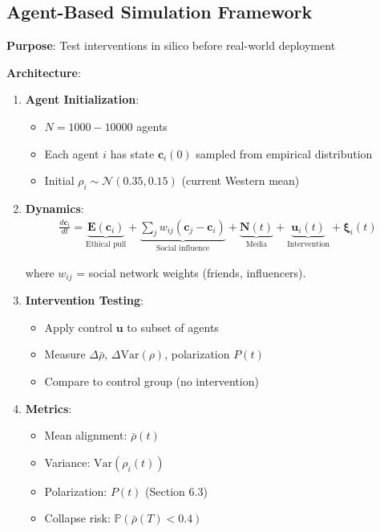 \documentclass[11pt,a4paper]{article}
\theoremstyle{definition}
\theoremstyle{remark}
\newcommand{\EE}{\mathbf{E}}
\newcommand{\cc}{\mathbf{c}}
\begin{document}
\begin{small}
\begin{enumerate}
\subsection{Agent-Based Simulation Framework}

\begin{protocol}
\textbf{Purpose}: Test interventions in silico before real-world deployment

\textbf{Architecture}:
\begin{enumerate}
    \item \textbf{Agent Initialization}:
        \begin{itemize}
            \item \(N = 1000-10000\) agents
            \item Each agent \(i\) has state \(\cc_i(0)\) sampled from empirical distribution
            \item Initial \(\rho_i \sim \mathcal{N}(0.35, 0.15)\) (current Western mean)
        \end{itemize}
    
    \item \textbf{Dynamics}:
        \begin{align}
        \frac{d\cc_i}{dt} = \underbrace{\EE(\cc_i)}_{\text{Ethical pull}} + \underbrace{\sum_j w_{ij}(\cc_j - \cc_i)}_{\text{Social influence}} + \underbrace{\mathbf{N}(t)}_{\text{Media}} + \underbrace{\mathbf{u}_i(t)}_{\text{Intervention}} + \boldsymbol{\xi}_i(t)
        \end{align}
        
        where \(w_{ij}\) = social network weights (friends, influencers).
    
    \item \textbf{Intervention Testing}:
        \begin{itemize}
            \item Apply control \(\mathbf{u}\) to subset of agents
            \item Measure \(\Delta\bar{\rho}\), \(\Delta\text{Var}(\rho)\), polarization \(P(t)\)
            \item Compare to control group (no intervention)
        \end{itemize}
    
    \item \textbf{Metrics}:
        \begin{itemize}
            \item Mean alignment: \(\bar{\rho}(t)\)
            \item Variance: \(\text{Var}(\rho_i(t))\)
            \item Polarization: \(P(t)\) (Section 6.3)
            \item Collapse risk: \(\mathbb{P}(\bar{\rho}(T) < 0.4)\)
        \end{itemize}
\end{enumerate}


\end{protocol}
\end{enumerate}
\end{small}
\end{document}
